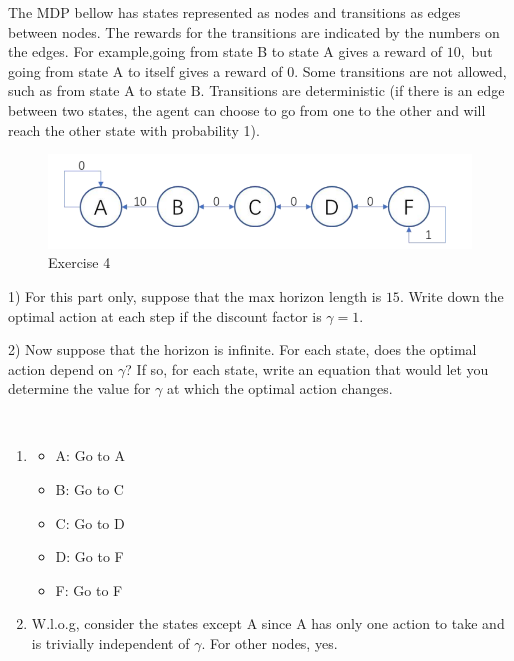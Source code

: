 \begin{exercise}[]{The MDP bellow has states represented as nodes and transitions as edges between nodes. The rewards for the transitions are indicated by the numbers on the edges. For example,going from state B to state A gives a reward of $10,$ but going from state A to itself gives a reward of $0 .$ Some transitions are not allowed, such as from state A to state $\mathrm{B}$. Transitions are deterministic (if there is an edge between two states, the agent can choose to go from one to the other and will reach the other state with probability 1).

    \begin{figure}[ht]
        \centering
        \includegraphics[width = 14cm]{img/ex2.png}
        \caption{Exercise 4}
    \end{figure} 

    1) For this part only, suppose that the max horizon length is $15 .$ Write down the optimal action at each step if the discount factor is $\gamma=1$.

    2) Now suppose that the horizon is infinite. For each state, does the optimal action depend on $\gamma$? If so, for each state, write an equation that would let you determine the value for $\gamma$ at which the optimal action changes.}
  \begin{solution}
  \par{~}
  \begin{enumerate}
      \item {
      \begin{itemize}
          \item A: Go to A
          \item B: Go to C
          \item C: Go to D
          \item D: Go to F
          \item F: Go to F
      \end{itemize}}
      \item {
          W.l.o.g, consider the states except A since A has only one action to take and is trivially independent of $\gamma$. For other nodes, yes.
          
}
\end{enumerate}
\end{solution}
\end{exercise}
